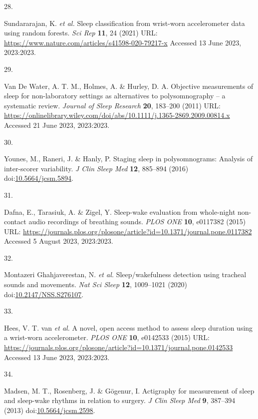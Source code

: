 \documentclass[
  9pt,
]{article}
\newlength{\cslhangindent}
\newlength{\csllabelwidth}
\newlength{\cslentryspacingunit} %
\newenvironment{CSLReferences}[2] %
 {%
  \setlength{\parindent}{0pt}
  \ifodd #1
  \let\oldpar\par
  \def\par{\hangindent=\cslhangindent\oldpar}
  \fi
  \setlength{\parskip}{#2\cslentryspacingunit}
 }%
 {}
\newcommand{\CSLLeftMargin}[1]{\parbox[t]{\csllabelwidth}{#1}}
\newcommand{\CSLRightInline}[1]{\parbox[t]{\linewidth - \csllabelwidth}{#1}\break}
\begin{document}
\begin{CSLReferences}{0}{0}
\leavevmode{}%
\CSLLeftMargin{28. }%
\CSLRightInline{Sundararajan, K. \emph{et al.} Sleep classification from
wrist-worn accelerometer data using random forests. \emph{Sci Rep}
\textbf{11}, 24 (2021) URL:
\url{https://www.nature.com/articles/s41598-020-79217-x} Accessed 13
June 2023, 2023:2023.}

\leavevmode{}%
\CSLLeftMargin{29. }%
\CSLRightInline{Van De Water, A. T. M., Holmes, A. \& Hurley, D. A.
Objective measurements of sleep for non-laboratory settings as
alternatives to polysomnography -- a systematic review. \emph{Journal of
Sleep Research} \textbf{20}, 183--200 (2011) URL:
\url{https://onlinelibrary.wiley.com/doi/abs/10.1111/j.1365-2869.2009.00814.x}
Accessed 21 June 2023, 2023:2023.}

\leavevmode{}%
\CSLLeftMargin{30. }%
\CSLRightInline{Younes, M., Raneri, J. \& Hanly, P. Staging sleep in
polysomnograms: Analysis of inter-scorer variability. \emph{J Clin Sleep
Med} \textbf{12}, 885--894 (2016)
doi:\href{https://doi.org/10.5664/jcsm.5894}{10.5664/jcsm.5894}.}

\leavevmode{}%
\CSLLeftMargin{31. }%
\CSLRightInline{Dafna, E., Tarasiuk, A. \& Zigel, Y. Sleep-wake
evaluation from whole-night non-contact audio recordings of breathing
sounds. \emph{{PLOS} {ONE}} \textbf{10}, e0117382 (2015) URL:
\url{https://journals.plos.org/plosone/article?id=10.1371/journal.pone.0117382}
Accessed 5 August 2023, 2023:2023.}

\leavevmode{}%
\CSLLeftMargin{32. }%
\CSLRightInline{Montazeri Ghahjaverestan, N. \emph{et al.}
Sleep/wakefulness detection using tracheal sounds and movements.
\emph{Nat Sci Sleep} \textbf{12}, 1009--1021 (2020)
doi:\href{https://doi.org/10.2147/NSS.S276107}{10.2147/NSS.S276107}.}

\leavevmode{}%
\CSLLeftMargin{33. }%
\CSLRightInline{Hees, V. T. van \emph{et al.} A novel, open access
method to assess sleep duration using a wrist-worn accelerometer.
\emph{{PLOS} {ONE}} \textbf{10}, e0142533 (2015) URL:
\url{https://journals.plos.org/plosone/article?id=10.1371/journal.pone.0142533}
Accessed 13 June 2023, 2023:2023.}

\leavevmode{}%
\CSLLeftMargin{34. }%
\CSLRightInline{Madsen, M. T., Rosenberg, J. \& Gögenur, I. Actigraphy
for measurement of sleep and sleep-wake rhythms in relation to surgery.
\emph{J Clin Sleep Med} \textbf{9}, 387--394 (2013)
doi:\href{https://doi.org/10.5664/jcsm.2598}{10.5664/jcsm.2598}.}


\end{CSLReferences}
\end{document}

